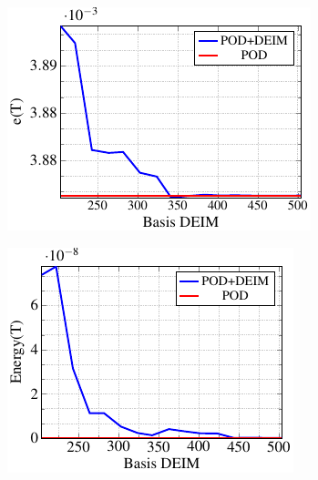\begin{figure}[h!]
\centering
\begin{subfigure}[]{0.47\linewidth}
        \includegraphics[scale=1]{Figures/paper-figure22.pdf}
\caption{}
\label{error_DEIM}
\end{subfigure}
\begin{subfigure}[]{0.47\linewidth}
        \includegraphics[scale=1]{Figures/paper-figure23.pdf}

\end{subfigure}
\end{figure}
